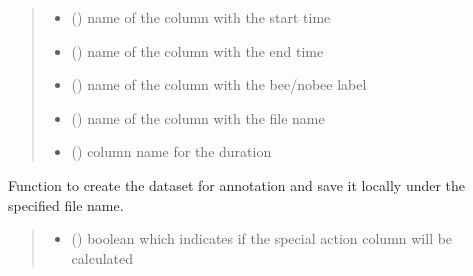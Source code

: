 \documentclass[letterpaper,10pt,english]{sphinxmanual}
\begin{document}
\begin{fulllineitems}
\begin{quote}
\begin{description}
\begin{itemize}
\item {} 
\sphinxAtStartPar
{} () \textendash{} name of the column with the start time

\item {} 
\sphinxAtStartPar
{} () \textendash{} name of the column with the end time

\item {} 
\sphinxAtStartPar
{} () \textendash{} name of the column with the bee/nobee label

\item {} 
\sphinxAtStartPar
{} () \textendash{} name of the column with the file name

\item {} 
\sphinxAtStartPar
{} () \textendash{} column name for the duration

\end{itemize}

\end{description}\end{quote}

\begin{fulllineitems}
\label{\detokenize{BeeData:BeeData.BeeData.annotation_data_creation}}
\pysigstartsignatures
{}
\pysigstopsignatures
\sphinxAtStartPar
Function to create the dataset for annotation and save it locally under the specified file name.
\begin{quote}\begin{description}
\begin{itemize}
\item {} 
\sphinxAtStartPar
{} () \textendash{} boolean which indicates if the special action column will be calculated


\end{itemize}
\end{description}
\end{quote}
\end{fulllineitems}
\end{fulllineitems}
\end{document}
